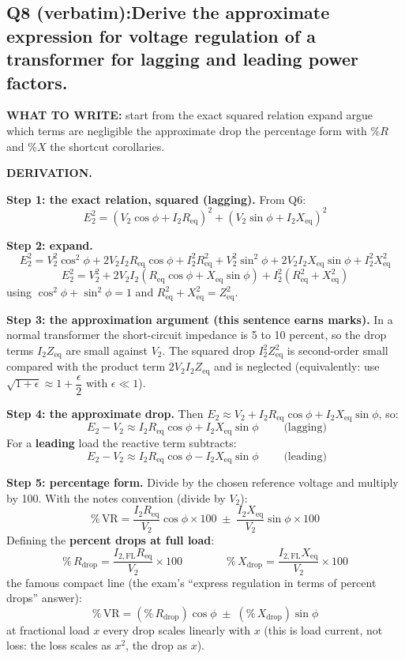 \documentclass[11pt]{article}
\newcommand{\qhead}[2]{\subsection*{\color{copper}#1\quad\color{iron}#2}}
\newcommand{\tagline}[1]{\textbf{\color{copper}#1}}
\begin{document}
\qhead{Q8 (verbatim):}{Derive the approximate expression for voltage regulation of a transformer for lagging and leading power factors.}

\tagline{WHAT TO WRITE:} start from the exact squared relation \textrightarrow{} expand \textrightarrow{} argue which terms are negligible \textrightarrow{} the approximate drop \textrightarrow{} the percentage form with $\%R$ and $\%X$ \textrightarrow{} the shortcut corollaries.

\tagline{DERIVATION.}

\textbf{Step 1: the exact relation, squared (lagging).} From Q6:
\[
E_2^{2} = \left(V_2\cos\phi + I_2 R_{\text{eq}}\right)^{2} + \left(V_2\sin\phi + I_2 X_{\text{eq}}\right)^{2}
\]

\textbf{Step 2: expand.}
\[
E_2^{2} = V_2^{2}\cos^{2}\phi + 2 V_2 I_2 R_{\text{eq}}\cos\phi + I_2^{2} R_{\text{eq}}^{2} + V_2^{2}\sin^{2}\phi + 2 V_2 I_2 X_{\text{eq}}\sin\phi + I_2^{2} X_{\text{eq}}^{2}
\]
\[
E_2^{2} = V_2^{2} + 2 V_2 I_2\left(R_{\text{eq}}\cos\phi + X_{\text{eq}}\sin\phi\right) + I_2^{2}\left(R_{\text{eq}}^{2} + X_{\text{eq}}^{2}\right)
\]
using $\cos^{2}\phi + \sin^{2}\phi = 1$ and $R_{\text{eq}}^{2} + X_{\text{eq}}^{2} = Z_{\text{eq}}^{2}$.

\textbf{Step 3: the approximation argument (this sentence earns marks).} In a normal transformer the short-circuit impedance is 5 to 10 percent, so the drop terms $I_2 Z_{\text{eq}}$ are small against $V_2$. The squared drop $I_2^{2} Z_{\text{eq}}^{2}$ is second-order small compared with the product term $2 V_2 I_2 Z_{\text{eq}}$ and is neglected (equivalently: use $\sqrt{1 + \epsilon} \approx 1 + \dfrac{\epsilon}{2}$ with $\epsilon \ll 1$).

\textbf{Step 4: the approximate drop.} Then $E_2 \approx V_2 + I_2 R_{\text{eq}}\cos\phi + I_2 X_{\text{eq}}\sin\phi$, so:
\[
\boxed{\;E_2 - V_2 \approx I_2 R_{\text{eq}}\cos\phi + I_2 X_{\text{eq}}\sin\phi\;}
\qquad\text{(lagging)}
\]
For a \textbf{leading} load the reactive term subtracts:
\[
\boxed{\;E_2 - V_2 \approx I_2 R_{\text{eq}}\cos\phi - I_2 X_{\text{eq}}\sin\phi\;}
\qquad\text{(leading)}
\]

\textbf{Step 5: percentage form.} Divide by the chosen reference voltage and multiply by 100. With the notes convention (divide by $V_2$):
\[
\%\,\text{VR} = \frac{I_2 R_{\text{eq}}}{V_2}\cos\phi \times 100 \;\pm\; \frac{I_2 X_{\text{eq}}}{V_2}\sin\phi \times 100
\]
Defining the \textbf{percent drops at full load}:
\[
\%\,R_{\text{drop}} = \frac{I_{2,\text{FL}} R_{\text{eq}}}{V_2} \times 100
\qquad\qquad
\%\,X_{\text{drop}} = \frac{I_{2,\text{FL}} X_{\text{eq}}}{V_2} \times 100
\]
the famous compact line (the exam's ``express regulation in terms of percent drops'' answer):
\[
\boxed{\;\%\,\text{VR} = \left(\%\,R_{\text{drop}}\right)\cos\phi \;\pm\; \left(\%\,X_{\text{drop}}\right)\sin\phi\;}
\]
at fractional load $x$ every drop scales linearly with $x$ (this is load current, not loss: the loss scales as $x^{2}$, the drop as $x$).
\end{document}
